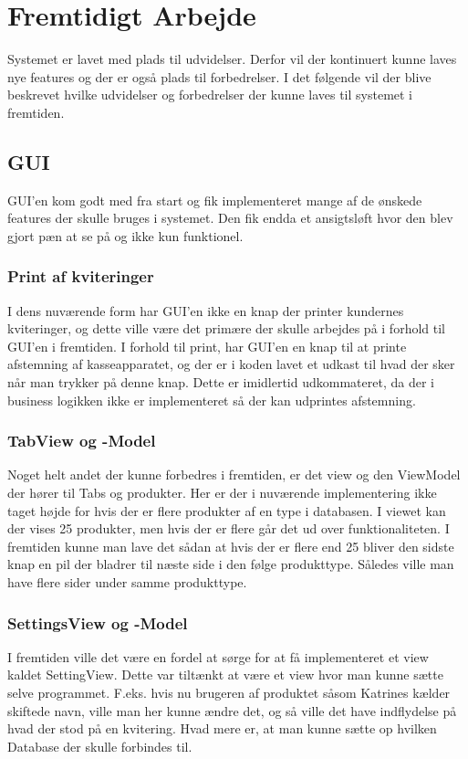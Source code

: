 \section{Fremtidigt Arbejde}
Systemet er lavet med plads til udvidelser. Derfor vil der kontinuert kunne laves nye features og der er også plads til forbedrelser. I det følgende vil der blive beskrevet hvilke udvidelser og forbedrelser der kunne laves til systemet i fremtiden. 

\subsection{GUI}
GUI'en kom godt med fra start og fik implementeret mange af de ønskede features der skulle bruges i systemet. Den fik endda et ansigtsløft hvor den blev gjort pæn at se på og ikke kun funktionel.\newline 
\subsubsection{Print af kviteringer}
I dens nuværende form har GUI'en ikke en knap der printer kundernes kviteringer, og dette ville være det primære der skulle arbejdes på i forhold til GUI'en i fremtiden. I forhold til print, har GUI'en en knap til at printe afstemning af kasseapparatet, og der er i koden lavet et udkast til hvad der sker når man trykker på denne knap. Dette er imidlertid udkommateret, da der i business logikken ikke er implementeret så der kan udprintes afstemning.\newline
\subsubsection{TabView og -Model}
Noget helt andet der kunne forbedres i fremtiden, er det view og den ViewModel der hører til Tabs og produkter. Her er der i nuværende implementering ikke taget højde for hvis der er flere produkter af en type i databasen. I viewet kan der vises 25 produkter, men hvis der er flere går det ud over funktionaliteten. I fremtiden kunne man lave det sådan at hvis der er flere end 25 bliver den sidste knap en pil der bladrer til næste side i den følge produkttype. Således ville man have flere sider under samme produkttype.\newline
\subsubsection{SettingsView og -Model}
I fremtiden ville det være en fordel at sørge for at få implementeret et view kaldet SettingView. Dette var tiltænkt at være et view hvor man kunne sætte selve programmet. F.eks. hvis nu brugeren af produktet såsom Katrines kælder skiftede navn, ville man her kunne ændre det, og så ville det have indflydelse på hvad der stod på en kvitering. Hvad mere er, at man kunne sætte op hvilken Database der skulle forbindes til. 
